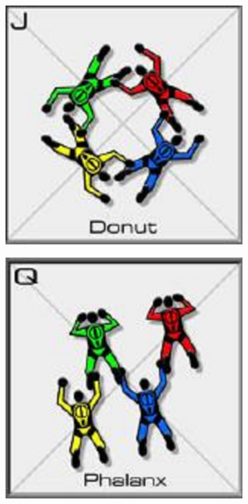 \documentclass[adpaper,12pt]{book}
\begin{document}
\begin{figure}[H]
	\centering
	\begin{subfigure}{.33\textwidth}
		\centering
		\includegraphics[width=0.9\linewidth]{FS_Donut.png}
	\end{subfigure}%
	\begin{subfigure}{.33\textwidth}
		\centering
		\includegraphics[width=0.9\linewidth]{FS_Phalanx.png}

\end{subfigure}
\end{figure}
\end{document}
